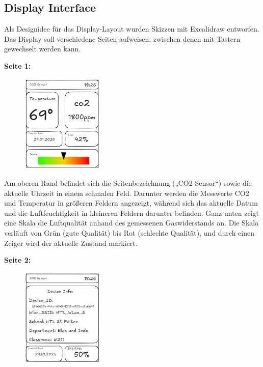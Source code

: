 \begin{inhalt}
\section{Display Interface} \label{sec:display interface}

Als Designidee für das Display-Layout wurden Skizzen mit Excalidraw \cite{Excalidraw} entworfen. Das Display soll verschiedene Seiten aufweisen, zwischen denen mit Tastern gewechselt werden kann. 

\smallskip

\begin{center}
    \textbf{Seite 1:}
\end{center}

\begin{figure}[!htb]
\centering
\includegraphics[width=0.35\textwidth]{files/Tobias/pics/Skizzen/Screen1_Sensor_Info.png}
\caption[Display Interface Skizze (Seite 1)]{}
\label{fig:display_skizze_seite_1}
\end{figure}

Am oberen Rand befindet sich die Seitenbezeichnung („CO2-Sensor“) sowie die aktuelle Uhrzeit in einem schmalen Feld. Darunter werden die Messwerte CO2 und Temperatur in größeren Feldern angezeigt, während sich das aktuelle Datum und die Luftfeuchtigkeit in kleineren Feldern darunter befinden. Ganz unten zeigt eine Skala die Luftqualität anhand des gemessenen Gaswiderstands an. Die Skala verläuft von Grün (gute Qualität) bis Rot (schlechte Qualität), und durch einen Zeiger wird der aktuelle Zustand markiert.

\begin{center}
    \textbf{Seite 2:}
\end{center}

\begin{figure}[!htb]
\centering
\includegraphics[width=0.35\textwidth]{files/Tobias/pics/Skizzen/Screen2_Info.png}
\caption[Display Interface Skizze (Seite 2)]{}
\label{fig:display_skizze_seite_2}
\end{figure}


\end{inhalt}
